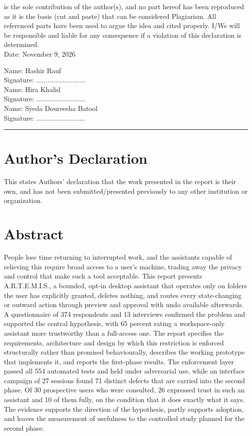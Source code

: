 \documentclass{FastFyp}
\begin{document}
is the sole contribution of the author(s), and no part hereof has been reproduced as it is the basis (cut and paste) that can be considered Plagiarism. All referenced parts have been used to argue the idea and cited properly. I/We will be responsible and liable for any consequence if a violation of this declaration is determined.
\\[4ex]
Date: November 9, 2026

\begin{flushright}
Name: Hashir Rauf
\\[3ex]
Signature: ..........................
\\[6ex]
Name: Hira Khalid
\\[3ex]
Signature: ..........................
\\[6ex]
Name: Syeda Doureesha Batool
\\[3ex]
Signature: ..........................

\end{flushright}

\vspace{5 cm}

\hrule

\section*{Author's Declaration}
This states Authors' declaration that the work presented in the report is their own, and has not been submitted/presented previously to any other institution or organization.
\pagebreak

\section*{Abstract}
People lose time returning to interrupted work, and the assistants capable of relieving this require broad access to a user's machine, trading away the privacy and control that make such a tool acceptable. This report presents A.R.T.E.M.I.S., a bounded, opt-in desktop assistant that operates only on folders the user has explicitly granted, deletes nothing, and routes every state-changing or outward action through preview and approval with undo available afterwards. A questionnaire of 374 respondents and 13 interviews confirmed the problem and supported the central hypothesis, with 65 percent rating a workspace-only assistant more trustworthy than a full-access one. The report specifies the requirements, architecture and design by which this restriction is enforced structurally rather than promised behaviourally, describes the working prototype that implements it, and reports the first-phase results. The enforcement layer passed all 554 automated tests and held under adversarial use, while an interface campaign of 27 sessions found 71 distinct defects that are carried into the second phase. Of 30 prospective users who were consulted, 26 expressed trust in such an assistant and 10 of them fully, on the condition that it does exactly what it says. The evidence supports the direction of the hypothesis, partly supports adoption, and leaves the measurement of usefulness to the controlled study planned for the second phase.
\pagebreak
\end{document}
